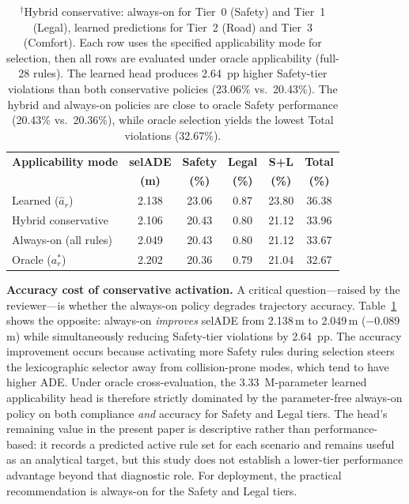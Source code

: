 \begin{table}[t]
\centering
\caption{Conservative Applicability Comparison (Cross-Evaluation: Mode-Specific Selection, Oracle Evaluation, Lexicographic, 43{,}219 Scenarios)}
\label{tab:conservative_applicability}
\setlength{\tabcolsep}{3pt}
\begin{tabular}{lccccc}
\toprule
\textbf{Applicability mode} & \textbf{selADE} & \textbf{Safety} & \textbf{Legal} & \textbf{S+L} & \textbf{Total} \\
 & \textbf{(m)} & \textbf{(\%)} & \textbf{(\%)} & \textbf{(\%)} & \textbf{(\%)} \\
\midrule
Learned ($\hat{a}_r$) & 2.138 & 23.06 & 0.87 & 23.80 & 36.38 \\
Hybrid conservative\rlap{$^{\dagger}$} & 2.106 & 20.43 & 0.80 & 21.12 & 33.96 \\
Always-on (all rules) & 2.049 & 20.43 & 0.80 & 21.12 & 33.67 \\
Oracle ($a_r^*$) & 2.202 & 20.36 & 0.79 & 21.04 & 32.67 \\
\bottomrule
\end{tabular}
\vspace{1mm}
\caption*{\footnotesize $^{\dagger}$Hybrid conservative: always-on for Tier~0 (Safety) and Tier~1 (Legal), learned predictions for Tier~2 (Road) and Tier~3 (Comfort).  Each row uses the specified applicability mode for selection, then all rows are evaluated under oracle applicability (full-28 rules).  The learned head produces 2.64~pp higher Safety-tier violations than both conservative policies (23.06\% vs.\ 20.43\%).  The hybrid and always-on policies are close to oracle Safety performance (20.43\% vs.\ 20.36\%), while oracle selection yields the lowest Total violations (32.67\%).}
\end{table}

\noindent\textbf{Accuracy cost of conservative activation.}  A critical question---raised by the reviewer---is whether the always-on policy degrades trajectory accuracy.  Table~\ref{tab:conservative_applicability} shows the opposite: always-on \emph{improves} selADE from 2.138\,m to 2.049\,m ($-$0.089\,m) while simultaneously reducing Safety-tier violations by 2.64~pp.  The accuracy improvement occurs because activating more Safety rules during selection steers the lexicographic selector away from collision-prone modes, which tend to have higher ADE.  Under oracle cross-evaluation, the 3.33\, M-parameter learned applicability head is therefore strictly dominated by the parameter-free always-on policy on both compliance \emph{and} accuracy for Safety and Legal tiers.  The head's remaining value in the present paper is descriptive rather than performance-based: it records a predicted active rule set for each scenario and remains useful as an analytical target, but this study does not establish a lower-tier performance advantage beyond that diagnostic role.  For deployment, the practical recommendation is always-on for the Safety and Legal tiers.

